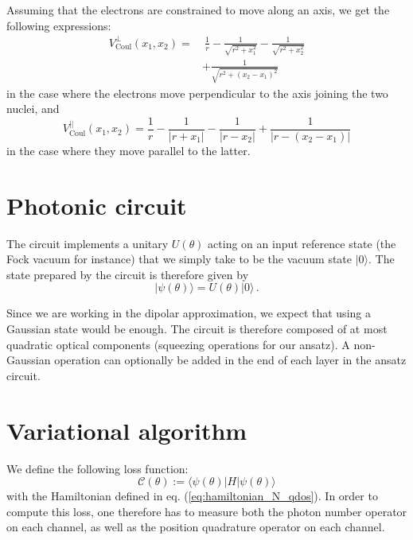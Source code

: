\documentclass[reprint, amsmath, amssymb, aps]{revtex4-2}
\begin{document}
                Assuming that the electrons are constrained to move along an axis, we get the following expressions:
                \begin{equation}
                \begin{split}
                    V_\text{Coul}^\perp(x_1, x_2) = &\ \frac{1}{r} - \frac{1}{\sqrt{r^2+x_1^2}} - \frac{1}{\sqrt{r^2+x_2^2}} \\
                    &+\frac{1}{\sqrt{r^2 + (x_2-x_1)^2}}
                \end{split}
                \end{equation}
                in the case where the electrons move perpendicular to the axis joining the two nuclei, and
                \begin{equation}
                    V_\text{Coul}^{||}(x_1, x_2) = \frac{1}{r} - \frac{1}{|r+x_1|} - \frac{1}{|r-x_2|} + \frac{1}{|r-(x_2-x_1)|}
                \end{equation}
                in the case where they move parallel to the latter.

\section{Photonic circuit}

    The circuit implements a unitary $U(\theta)$ acting on an input reference state (the Fock vacuum for instance) that we simply take to be the vacuum state $|0\rangle$. The state prepared by the circuit is therefore given by
    \begin{equation}
        |\psi(\theta)\rangle = U(\theta)|0\rangle\,.
    \end{equation}

    Since we are working in the dipolar approximation, we expect that using a Gaussian state would be enough. The circuit is therefore composed of at most quadratic optical components (squeezing operations for our ansatz). A non-Gaussian operation can optionally be added in the end of each layer in the ansatz circuit.

\section{Variational algorithm}

    We define the following loss function:
    \begin{equation}
        \mathcal C(\theta) := \langle\psi(\theta)|H|\psi(\theta)\rangle
    \end{equation}
    with the Hamiltonian defined in eq. (\ref{eq:hamiltonian_N_qdos}).
    In order to compute this loss, one therefore has to measure both the photon number operator on each channel, as well as the position quadrature operator on each channel.
    \newpage
\end{document}
